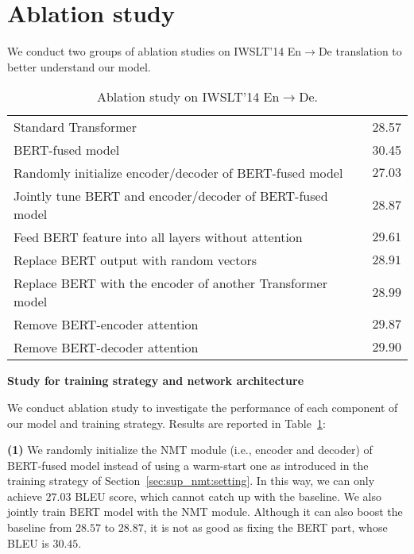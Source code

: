 \documentclass{article} \usepackage{iclr2020_conference,times}
\begin{document}
\section{Ablation study}\label{sec:ablation_study}
We conduct two groups of ablation studies on IWSLT'14 En$\to$De translation to better understand our model.
\begin{table}[!htbp]
\centering
\caption{Ablation study on IWSLT'14 En$\to$De.}
\begin{tabular}{lc}
\toprule
Standard Transformer & 28.57\\
BERT-fused model & 30.45\\
\midrule
Randomly initialize encoder/decoder of BERT-fused model & $27.03$ \\
Jointly tune BERT and encoder/decoder of BERT-fused model& $28.87$ \\
\midrule
Feed BERT feature into all layers without attention & $29.61$ \\
Replace BERT output with random vectors & $28.91$ \\
Replace BERT with the encoder of another Transformer model& $28.99$\\ 
\midrule
Remove BERT-encoder attention & $29.87$ \\
Remove BERT-decoder attention & $29.90$ \\
\bottomrule
\end{tabular}
\label{tab:results_iwslt_en-de-ablation-study}
\end{table}

\noindent\textbf{ Study for training strategy and network architecture}

We conduct ablation study to investigate the performance of each component of our model and training strategy. Results are reported in Table~\ref{tab:results_iwslt_en-de-ablation-study}:

\noindent\textbf{(1)} We randomly initialize the NMT module (i.e., encoder and decoder) of BERT-fused model instead of using a warm-start one as introduced in the training strategy of Section~\ref{sec:sup_nmt:setting}. In this way, we can only achieve $27.03$ BLEU score, which cannot catch up with the baseline. We also jointly train BERT model with the NMT module. Although it can also boost the baseline from $28.57$ to $28.87$, it is not as good as fixing the BERT part, whose BLEU is $30.45$. 
\end{document}
